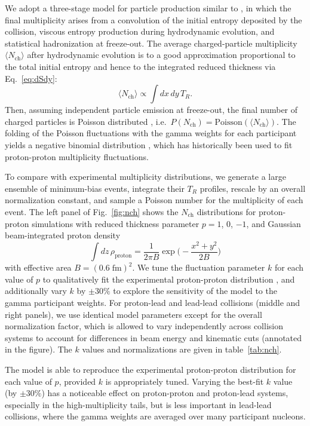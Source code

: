 \documentclass[aps,prc,reprint,amsmath]{revtex4-1}
\newcommand{\avg}[1]{\langle #1 \rangle}
\newcommand{\nch}{N_\text{ch}}
\begin{document}
We adopt a three-stage model for particle production similar to \cite{Bozek:2013uha}, in which the final multiplicity arises from a convolution of the initial entropy deposited by the collision, viscous entropy production during hydrodynamic evolution, and statistical hadronization at freeze-out.
The average charged-particle multiplicity $\avg\nch$ after hydrodynamic evolution is to a good approximation proportional to the total initial entropy \cite{Song:2008si} and hence to the integrated reduced thickness via Eq.~\eqref{eq:dSdy}:
\begin{equation}
  \avg\nch \propto \int dx \, dy \, T_R.
\end{equation}
Then, assuming independent particle emission at freeze-out, the final number of charged particles is Poisson distributed \cite{Kisiel:2005hn,*Chojnacki:2011hb}, i.e.~$P(\nch) = \text{Poisson}(\avg\nch)$.
The folding of the Poisson fluctuations with the gamma weights for each participant yields a negative binomial distribution \cite{Bozek:2013uha}, which has historically been used to fit proton-proton multiplicity fluctuations.

To compare with experimental multiplicity distributions, we generate a large ensemble of minimum-bias events, integrate their $T_R$ profiles, rescale by an overall normalization constant, and sample a Poisson number for the multiplicity of each event.
The left panel of Fig.~\ref{fig:nch} shows the $\nch$ distributions for proton-proton simulations with reduced thickness parameter $p = 1$, 0, $-1$, and Gaussian beam-integrated proton density
\begin{equation}
  \int dz \, \rho_\text{proton} = \frac{1}{2\pi B} \exp\biggr( -\frac{x^2 + y^2}{2B} \biggr)
\end{equation}
with effective area $B = (0.6\;\text{fm})^2$.
We tune the fluctuation parameter $k$ for each value of $p$ to qualitatively fit the experimental proton-proton distribution \cite{Aamodt:2010ft}, and additionally vary $k$ by $\pm30\%$ to explore the sensitivity of the model to the gamma participant weights.
For proton-lead and lead-lead collisions \cite{Abelev:2014mda} (middle and right panels), we use identical model parameters except for the overall normalization factor, which is allowed to vary independently across collision systems to account for differences in beam energy and kinematic cuts (annotated in the figure).
The $k$ values and normalizations are given in table~\ref{tab:nch}.

The model is able to reproduce the experimental proton-proton distribution for each value of $p$, provided $k$ is appropriately tuned.
Varying the best-fit $k$ value (by $\pm30\%$) has a noticeable effect on proton-proton and proton-lead systems, especially in the high-multiplicity tails, but is less important in lead-lead collisions, where the gamma weights are averaged over many participant nucleons.
\end{document}
